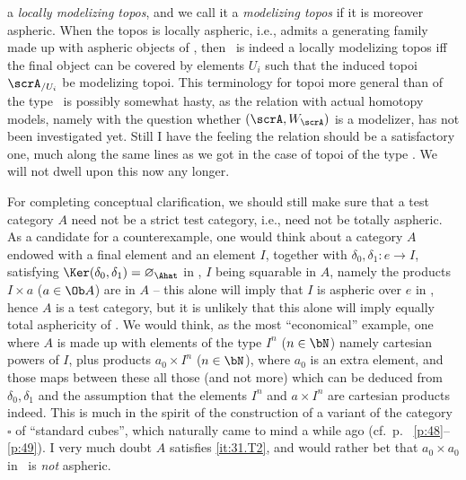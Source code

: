 a \emph{locally modelizing topos}, and we call it a \emph{modelizing
  topos} if it is moreover aspheric. When the topos is locally
aspheric, i.e., admits a generating family made up with aspheric
objects of \scrA, then \scrA\ is indeed a locally modelizing topos
if{f} the final object can be covered by elements $U_i$ such that the
induced topoi $\scrA_{/U_i}$ be modelizing topoi. This terminology for
topoi more general than of the type \Ahat\ is possibly somewhat hasty,
as the relation with actual homotopy models, namely with the question
whether $(\scrA,W_\scrA)$ is a modelizer, has not been investigated
yet. Still I have the feeling the relation should be a satisfactory
one, much along the same lines as we got in the case of topoi of the
type \Ahat. We will not dwell upon this now any longer.

For completing conceptual clarification, we should still make sure
that a test category $A$ need not be a strict test category, i.e.,
need not be totally aspheric. As a candidate for a counterexample, one
would think about a category $A$ endowed with a final element and an
element $I$, together with $\delta_0,\delta_1:e\to I$, satisfying
$\Ker(\delta_0,\delta_1)=\varnothing_\Ahat$ in \Ahat, $I$ being
squarable in $A$, namely the products $I\times a$ ($a \in \Ob A$) are
in $A$ -- this alone will imply that $I$ is aspheric over $e$ in
\Ahat, hence $A$ is a test category, but it is unlikely that this
alone will imply equally total asphericity of \Ahat. We would think,
as the most ``economical'' example, one where $A$ is made up with
elements of the type $I^n$ ($n\in\bN$) namely cartesian
powers of $I$, plus products $a_0\times I^n$ ($n\in\bN$), where $a_0$
is an extra element, and those maps between these all those (and not
more) which can be deduced from $\delta_0,\delta_1$ and the assumption
that the elements $I^n$ and $a\times I^n$ are cartesian products
indeed. This is much in the spirit of the construction of a variant of
the category $\square$ of ``standard cubes'', which naturally came to
mind a while ago (cf.\ p.~%
\ref{p:48}--\ref{p:49}). I very much doubt $A$
satisfies \ref{it:31.T2}, and would rather bet that $a_0 \times a_0$
in \Ahat\ is \emph{not} aspheric.

